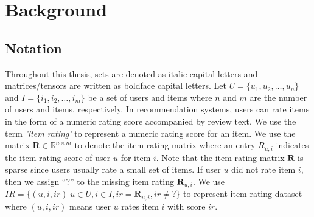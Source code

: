 \documentclass[master,english,final]{kaist-ucs}
\begin{document}





%

\chapter{Background}
\section{Notation}
Throughout this thesis, sets are denoted as italic capital letters and matrices/tensors are written as boldface capital letters.
Let $U = \{u_1,u_2,…,u_n\}$ and $I = \{i_1,i_2,…,i_m\}$ be a set of users and items where $n$ and $m$ are the number of users and items, respectively.
In recommendation systems, users can rate items in the form of a numeric rating score accompanied by review text.
We use the term \textit{'item rating'} to represent a numeric rating score for an item.
We use the matrix $ \bm{R} \in \mathbb{R}^{n \times m} $ to denote the item rating matrix where an entry $ R_{u,i} $ indicates the item rating score of user $u$ for item $i$.
Note that the item rating matrix $\bm{R}$ is sparse since users usually rate a small set of items.
If user $u$ did not rate item $i$, then we assign “?” to the missing item rating $\bm{R}_{u,i}$.
We use $IR=\{(u,i,ir)| u \in U,i \in I,ir=\bm{R}_{u,i},ir \neq ? \}$ to represent item rating dataset where $(u,i,ir)$ means user $u$ rates item $i$ with score $ir$.
\end{document}
